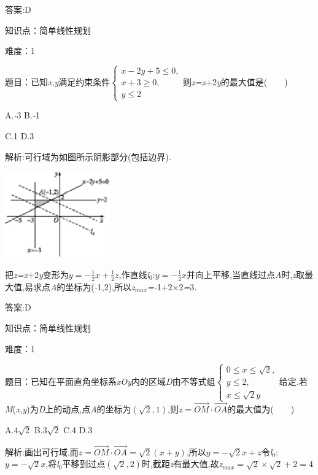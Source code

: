 \documentclass{article} %
\begin{document}
 答案:D

知识点：简单线性规划

难度：1

 题目：已知\textit{x},\textit{y}满足约束条件$
\begin{cases}
x-2y+5 \le 0,\\
x+3\ge 0,\\
y \le 2
\end{cases}$则\textit{z=x$+$}2\textit{y}的最大值是(\textit{　　})

 A.\textit{-}3 B.\textit{-}1 

 C.1 D.3

 解析:可行域为如图所示阴影部分(包括边界)\textit{.}

 \includegraphics*[width=1.78in, height=1.46in, keepaspectratio=false]{image1576}

把\textit{z=x$+$}2\textit{y}变形为$y=-\frac{1}{2}x+\frac{1}{2}z$,作直线\textit{l}${}_{0}$:$y=-\frac{1}{2}x$并向上平移,当直线过点\textit{A}时,\textit{z}取最大值,易求点\textit{A}的坐标为(\textit{-}1,2),所以\textit{z}${}_{max}$\textit{=-}1\textit{$+$}2\textit{$\times$}2\textit{=}3\textit{.}

 答案:D

知识点：简单线性规划

难度：1

 题目：已知在平面直角坐标系\textit{xOy}内的区域\textit{D}由不等式组$
\begin{cases}
0 \le x \le \sqrt{2},\\
y \le 2,\\
x \le \sqrt{2}y
\end{cases}$给定\textit{.}若\textit{M}(\textit{x},\textit{y})为\textit{D}上的动点,点\textit{A}的坐标为$(\sqrt{2},1)$,则$z=\vec{OM}\cdot\vec{OA}$的最大值为(\textit{　　})

 A.$4\sqrt{2}$ B.$3\sqrt{2}$ C.4 D.3

 解析:画出可行域,而$z=\vec{OM}\cdot\vec{OA}=\sqrt{2}(x+y)$,所以$y=-\sqrt{2}x+z$令\textit{l}${}_{0}$:$y=-\sqrt{2}x$,将\textit{l}${}_{0}$平移到过点$(\sqrt{2},2)$时,截距\textit{z}有最大值,故\textit{z}${}_{max}$$=\sqrt{2}\times\sqrt{2}+2=4$
\end{document}
